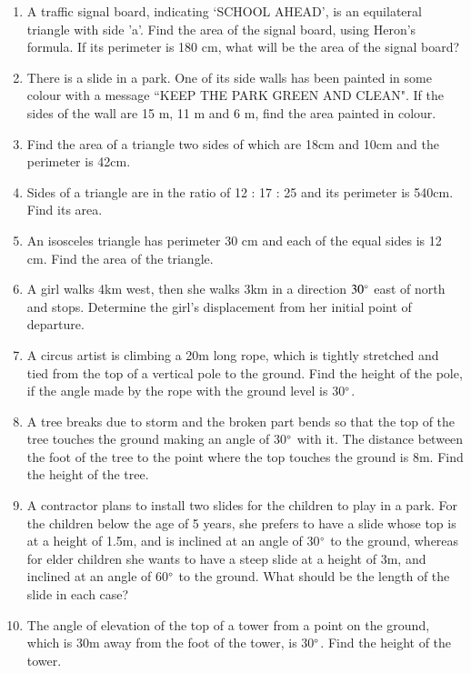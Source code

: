 \begin{enumerate}[label=\arabic*.,ref=\thesubsection.\theenumi]
\item A traffic signal board, indicating ‘SCHOOL AHEAD’, is an equilateral triangle with side 'a'. Find the area of the signal board, using Heron's formula. If its perimeter is 180 cm, what will be the area of the signal board?

\item There is a slide in a park. One of its side walls has been painted in some colour with a message ``KEEP THE PARK GREEN AND CLEAN". If the sides of the wall are 15 m, 11 m and 6 m, find the area painted in colour.
\item Find the area of a triangle two sides of which are 18cm and 10cm and the perimeter is 42cm.
\item Sides of a triangle are in the ratio of 12 : 17 : 25 and its perimeter is 540cm. Find its area. 
\item  An isosceles triangle has perimeter 30 cm and each of the equal sides is 12 cm. Find the area of the triangle.
\item A girl walks 4km west, then she walks 3km in a direction $30\degree$ east of north and stops.  Determine the girl's displacement from her initial point of departure.
%
\item A circus artist is climbing a 20m long rope, which is tightly stretched and tied from the top of a vertical pole to the ground.  Find the height of the pole, if the angle made by the rope with the ground level is 30$\degree$.
%
\item A tree breaks due to storm and the broken part bends so that the top of the tree touches the ground making an angle of 30$\degree$ with it.  The distance between the foot of the tree to the point where the top touches the ground is 8m.  Find the height of the tree.
%
\item A contractor plans to install two slides for the children to play in a park.  For the children below the age of 5 years, she prefers to have a slide whose top is at a height of 1.5m, and is inclined at an angle of 30$\degree$  to the ground, whereas for elder children she wants to have a steep slide at a height of 3m, and inclined at an angle of 60$\degree$ to the ground.  What should be the length of the slide in each case?
%
\item The angle of elevation of the top of a tower from a point on the ground, which is 30m away from the foot of the tower, is 30$\degree$.  Find the height of the tower.

\end{enumerate}
